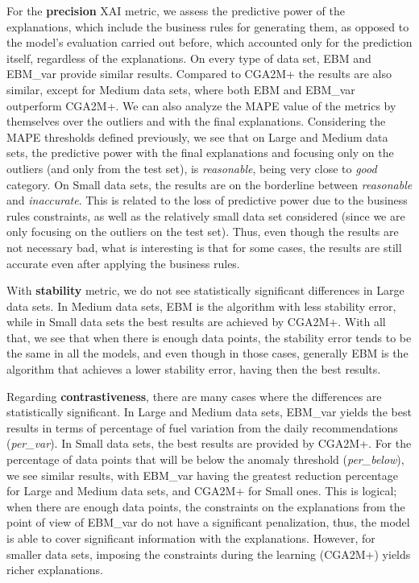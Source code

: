 For the \textbf{precision} XAI metric, we assess the predictive power of the explanations, which include the business rules for generating them, as opposed to the model's evaluation carried out before, which accounted only for the prediction itself, regardless of the explanations. On every type of data set, EBM and EBM\_var provide similar results. Compared to CGA2M+ the results are also similar, except for Medium data sets, where both EBM and EBM\_var outperform CGA2M+. We can also analyze the MAPE value of the metrics by themselves over the outliers and with the final explanations. Considering the MAPE thresholds defined previously, we see that on Large and Medium data sets, the predictive power with the final explanations and focusing only on the outliers (and only from the test set), is \textit{reasonable}, being very close to \textit{good} category. On Small data sets, the results are on the borderline between \textit{reasonable} and \textit{inaccurate}. This is related to the loss of predictive power due to the business rules constraints, as well as the relatively small data set considered (since we are only focusing on the outliers on the test set). Thus, even though the results are not necessary bad, what is interesting is that for some cases, the results are still accurate even after applying the business rules.

With \textbf{stability} metric, we do not see statistically significant differences in Large data sets. In Medium data sets, EBM is the algorithm with less stability error, while in Small data sets the best results are achieved by CGA2M+. With all that, we see that when there is enough data points, the stability error tends to be the same in all the models, and even though in those cases, generally EBM is the algorithm that achieves a lower stability error, having then the best results.

Regarding \textbf{contrastiveness}, there are many cases where the differences are statistically significant. In Large and Medium data sets, EBM\_var yields the best results in terms of percentage of fuel variation from the daily recommendations (\textit{per\_var}). In Small data sets, the best results are provided by CGA2M+. For the percentage of data points that will be below the anomaly threshold (\textit{per\_below}), we see similar results, with EBM\_var having the greatest reduction percentage for Large and Medium data sets, and CGA2M+ for Small ones. This is logical; when there are enough data points, the constraints on the explanations from the point of view of EBM\_var do not have a significant penalization, thus, the model is able to cover significant information with the explanations. However, for smaller data sets, imposing the constraints during the learning (CGA2M+) yields richer explanations.

